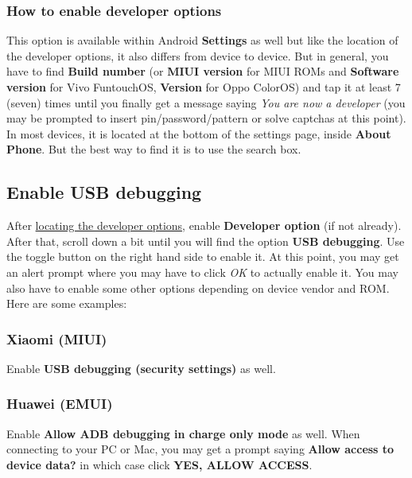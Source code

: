 \subsubsection{How to enable developer options} %
This option is available within Android \textbf{Settings} as well but like the location of the developer options, it
also differs from device to device. But in general, you have to find \textbf{Build number} (or \textbf{MIUI version} for
MIUI ROMs and \textbf{Software version} for Vivo FuntouchOS, \textbf{Version} for Oppo ColorOS) and tap it at least 7
(seven) times until you finally get a message saying \textit{You are now a developer} (you may be prompted to insert
pin/password/pattern or solve captchas at this point). In most devices, it is located at the bottom of the settings
page, inside \textbf{About Phone}. But the best way to find it is to use the search box.

\subsection{Enable USB debugging}\label{subsec:enable-usb-debugging} %
After \hyperref[subsubsec:location-of-developer-options]{locating the developer options}, enable \textbf{Developer
option} (if not already). After that, scroll down a bit until you will find the option \textbf{USB debugging}. Use the
toggle button on the right hand side to enable it. At this point, you may get an alert prompt where you may have to
click \textit{OK} to actually enable it. You may also have to enable some other options depending on device vendor and
ROM. Here are some examples:

\subsubsection{Xiaomi (MIUI)} %
Enable \textbf{USB debugging (security settings)} as well.

\subsubsection{Huawei (EMUI)} %
Enable \textbf{Allow ADB debugging in charge only mode} as well. When connecting to your PC or Mac, you may get a prompt
saying \textbf{Allow access to device data?} in which case click \textbf{YES, ALLOW ACCESS}.

